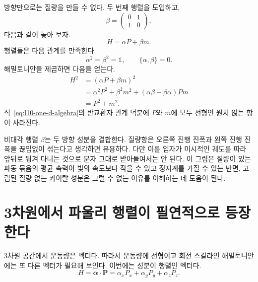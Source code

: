 방향만으로는 질량을 만들 수 없다. 두 번째 행렬을 도입하고,
\begin{equation}
\beta=
\begin{pmatrix}
0&1\\
1&0
\end{pmatrix},
\end{equation}
다음과 같이 놓아 보자.
\begin{equation}
H=\alpha P+\beta m.
\label{eq:l10-massive-one-d}
\end{equation}
행렬들은 다음 관계를 만족한다.
\begin{equation}
\alpha^2=\beta^2=\mathbb{1},
\qquad
\{\alpha,\beta\}=0.
\label{eq:l10-one-d-algebra}
\end{equation}
해밀토니안을 제곱하면 다음을 얻는다.
\begin{align}
H^2
&=(\alpha P+\beta m)^2\\
&=\alpha^2P^2+\beta^2m^2
  +(\alpha\beta+\beta\alpha)Pm\\
&=P^2+m^2.
\label{eq:l10-one-d-dispersion}
\end{align}
식~\eqref{eq:l10-one-d-algebra}의 반교환자 관계 덕분에 \(P\)와 \(m\)에 모두 선형인 원치 않는 항이 사라진다.

비대각 행렬 \(\beta\)는 두 방향 성분을 결합한다. 질량항은 오른쪽 진행 진폭과 왼쪽 진행 진폭을 끊임없이 섞는다고 생각하면 유용하다. 다만 이를 입자가 미시적인 궤도를 따라 앞뒤로 튕겨 다니는 것으로 문자 그대로 받아들여서는 안 된다. 이 그림은 질량이 있는 파동 묶음의 평균 속력이 빛의 속도보다 작을 수 있고 정지계를 가질 수 있는 반면, 고립된 질량 없는 카이랄 성분은 그럴 수 없는 이유를 이해하는 데 도움이 된다.

\begin{classroomqa}\end{classroomqa}

\section{3차원에서 파울리 행렬이 필연적으로 등장한다}

3차원 공간에서 운동량은 벡터다. 따라서 운동량에 선형이고 회전 스칼라인 해밀토니안에는 또 다른 벡터가 필요해 보인다. 이번에는 성분이 행렬인 벡터다.
\begin{equation}
H=\boldsymbol{\alpha}\cdot\mathbf P
=\alpha_xP_x+\alpha_yP_y+\alpha_zP_z.
\label{eq:l10-three-d-ansatz}
\end{equation}

